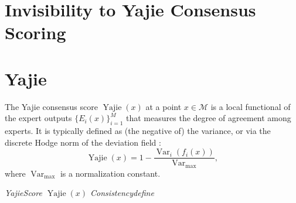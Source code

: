 \documentclass[11pt,a4paper]{article}
\theoremstyle{plain}
\theoremstyle{definition}
\DeclareMathOperator{\Yajie}{Yajie}
\newcommand{\cM}{\mathcal{M}}
\begin{document}
\section{Invisibility to Yajie Consensus Scoring}
\section*{Yajie}

The Yajie consensus score $\Yajie(x)$ at a point $x \in \cM$ is a local 
functional of the expert outputs $\{E_i(x)\}_{i=1}^{M}$ that measures the 
degree of agreement among experts. It is typically defined as (the negative 
of) the variance, or via the discrete Hodge norm of the deviation field 
\cite{scx_framework}:
\begin{equation}
  \Yajie(x) = 1 - \frac{\operatorname{Var}_i(f_i(x))}{\operatorname{Var}_{\max}},
  \label{eq:yajie_def}
\end{equation}
where $\operatorname{Var}_{\max}$ is a normalization constant.

\bigskip
\noindent
\textit{YajieScore $\Yajie(x)$ Consistencydefine}
\end{document}
